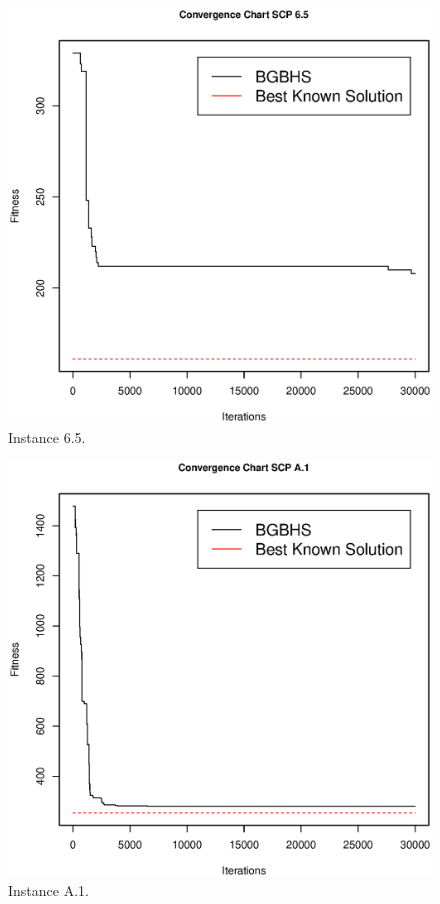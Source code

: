 \begin{figure}[]
\centering
\includegraphics[scale=.45]{Resultados/scp65.eps}
\caption{Instance 6.5.}
\label{fig:Instance.6.5}
\end{figure}

\begin{figure}[]
\centering
\includegraphics[scale=.45]{Resultados/scpA1.eps}
\caption{Instance A.1.}
\label{fig:Instance.A.1}
\end{figure}

